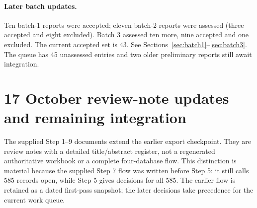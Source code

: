 \paragraph{Later batch updates.} Ten batch-1 reports were accepted; eleven batch-2 reports were assessed (three accepted and eight excluded). Batch 3 assessed ten more, nine accepted and one excluded. The current accepted set is 43. See Sections~\ref{sec:batch1}--\ref{sec:batch3}. The queue has 45 unassessed entries and two older preliminary reports still await integration.

\section{17 October review-note updates and remaining integration}
The supplied Step 1--9 documents extend the earlier export checkpoint. They are review notes with a detailed title/abstract register, not a regenerated authoritative workbook or a complete four-database flow. This distinction is material because the supplied Step 7 flow was written before Step 5: it still calls 585 records open, while Step 5 gives decisions for all 585. The earlier flow is retained as a dated first-pass snapshot; the later decisions take precedence for the current work queue.

